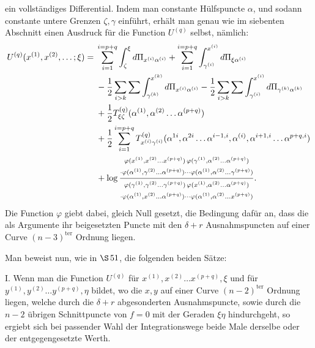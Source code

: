 \documentclass[10pt]{article}
\begin{document}
ein vollständiges Differential. Indem man constante Hülfspuncte \(\alpha\), und sodann constante untere Grenzen \(\zeta,\gamma\) einführt, erhält man genau wie im siebenten Abschnitt einen Ausdruck für die Function \(U^{(q)}\) selbst, nämlich:
\[
\begin{aligned}
U^{(q)}(x^{(1)},x^{(2)},\ldots;\xi)
={}&
\sum_{i=1}^{i=p+q}\int_{\zeta}^{\xi}d\Pi_{x^{(i)}\alpha^{(i)}}
+\sum_{i=1}^{i=p+q}\int_{\gamma^{(i)}}^{x^{(i)}}d\Pi_{\xi\alpha^{(i)}}\\
&-\frac12\sum_{i>k}\sum\int_{\gamma^{(k)}}^{x^{(k)}}d\Pi_{x^{(i)}\alpha^{(i)}}
-\frac12\sum_{i>k}\sum\int_{\gamma^{(i)}}^{x^{(i)}}d\Pi_{\gamma^{(k)}\alpha^{(k)}}\\
&+\frac12 T_{\xi\zeta}^{(q)}(\alpha^{(1)},\alpha^{(2)}\ldots\alpha^{(p+q)})\\
&+\frac12\sum_{i=1}^{i=p+q}
T_{x^{(i)}\gamma^{(i)}}^{(q)}
(\alpha^{1i},\alpha^{2i}\ldots\alpha^{i-1,i},\alpha^{(i)},\alpha^{i+1,i}\ldots\alpha^{p+q,i})\\
&+\log\frac{%
\begin{gathered}\scriptstyle
\varphi(x^{(1)},x^{(2)}\ldots x^{(p+q)})\,
\varphi(\gamma^{(1)},\alpha^{(2)}\ldots\alpha^{(p+q)})\\[-0.15em]
\scriptstyle{}\cdot
\varphi(\alpha^{(1)},\gamma^{(2)}\ldots\alpha^{(p+q)})\cdots
\varphi(\alpha^{(1)},\alpha^{(2)}\ldots\gamma^{(p+q)})
\end{gathered}}{%
\begin{gathered}\scriptstyle
\varphi(\gamma^{(1)},\gamma^{(2)}\ldots\gamma^{(p+q)})\,
\varphi(x^{(1)},\alpha^{(2)}\ldots\alpha^{(p+q)})\\[-0.15em]
\scriptstyle{}\cdot
\varphi(\alpha^{(1)},x^{(2)}\ldots\alpha^{(p+q)})\cdots
\varphi(\alpha^{(1)},\alpha^{(2)}\ldots x^{(p+q)})
\end{gathered}}.
\end{aligned}
\]
Die Function \(\varphi\) giebt dabei, gleich Null gesetzt, die Bedingung dafür an, dass die als Argumente ihr beigesetzten Puncte mit den \(\delta+r\) Ausnahmspuncten auf einer Curve \((n-3)^{\mathrm{ter}}\) Ordnung liegen.

Man beweist nun, wie in \(\S\,51\), die folgenden beiden Sätze:

I. Wenn man die Function \(U^{(q)}\) für \(x^{(1)},x^{(2)}\ldots x^{(p+q)}, \xi\) und für \(y^{(1)},y^{(2)}\ldots y^{(p+q)}, \eta\) bildet, wo die \(x,y\) auf einer Curve \((n-2)^{\mathrm{ter}}\) Ordnung liegen, welche durch die \(\delta+r\) abgesonderten Ausnahmspuncte, sowie durch die \(n-2\) übrigen Schnittpuncte von \(f=0\) mit der Geraden \(\xi\eta\) hindurchgeht, so ergiebt sich bei passender Wahl der Integrationswege beide Male derselbe oder der entgegengesetzte Werth.
\end{document}
